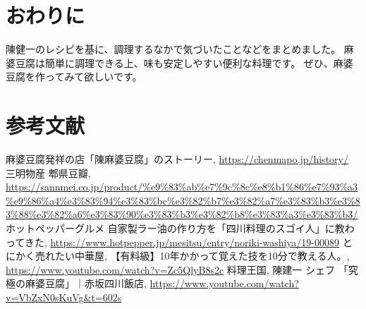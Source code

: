\documentclass[a4paper,10pt,xelatex,ja=standard,twocolumn]{bxjsarticle}
\begin{document}
\section{おわりに}

陳健一のレシピを基に、調理するなかで気づいたことなどをまとめました。
麻婆豆腐は簡単に調理できる上、味も安定しやすい便利な料理です。
ぜひ、麻婆豆腐を作ってみて欲しいです。

\section{参考文献}
\begin{thebibliography}{99}
 麻婆豆腐発祥の店「陳麻婆豆腐」のストーリー, \url{https://chenmapo.jp/history/}
 三明物産 郫県豆瓣, \url{https://sannmei.co.jp/product/%e9%83%ab%e7%9c%8c%e8%b1%86%e7%93%a3%e9%86%a4%e3%83%94%e3%83%bc%e3%82%b7%e3%82%a7%e3%83%b3%e3%83%88%e3%82%a6%e3%83%90%e3%83%b3%e3%82%b8%e3%83%a3%e3%83%b3/}
 ホットペッパーグルメ 自家製ラー油の作り方を「四川料理のスゴイ人」に教わってきた, \url{https://www.hotpepper.jp/mesitsu/entry/noriki-washiya/19-00089}
 とにかく売れたい中華屋, 【有料級】10年かかって覚えた技を10分で教える人。, \url{https://www.youtube.com/watch?v=Zc5QlyB8s2c}
 料理王国, 陳建一 シェフ 「究極の麻婆豆腐」｜赤坂四川飯店, \url{https://www.youtube.com/watch?v=VbZxN0sKuVg&t=602s}
\end{thebibliography}
\end{document}
